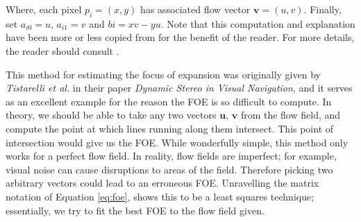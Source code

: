 \documentclass[a4paper,11pt,twoside,openright]{article}
\begin{document}
Where, each pixel $p_i = (x, y)$ has associated flow vector $\mathbf{v} = (u,v)$.
Finally, set $a_{i0} = u$, $a_{i1} = v$ and $b{i} = xv - yu$. Note that this
computation and explanation have been more or less copied from
\cite{Mitchell2018} for the benefit of the reader. For more details, the reader
should consult \cite{ODonovan2005}.
\newline
\par

This method for estimating the focus of expansion was originally given by
\textit{Tistarelli et al.} in their paper
\textit{Dynamic Stereo in Visual Navigation}\cite{Tistarelli1991, ODonovan2005},
and it serves as an excellent example for the reason the FOE is so difficult to
compute. In theory, we should be able to take any two vectors $\mathbf{u}$,
$\mathbf{v}$ from the flow field, and compute the point at which lines
running along them intersect. This point of intersection would give us the
FOE\cite{ODonovan2005}. While wonderfully simple, this method only works for
a perfect flow field. In reality, flow fields are imperfect; for example,
visual noise can cause disruptions to areas of the field. Therefore picking two
arbitrary vectors could lead to an erroneous FOE. Unravelling the matrix notation
of Equation \ref{eq:foe}, shows this to be a least squares technique;
essentially, we try to fit the best FOE to the flow field given.


\end{document}
